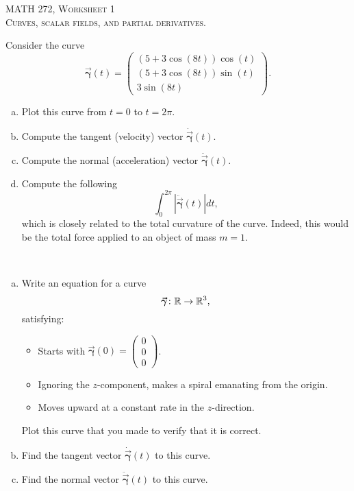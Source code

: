 \documentclass[12pt]{article} %
\newcommand{\curvegamma}{\boldsymbol{\vec{\gamma}}}
\newcommand{\tangentgamma}{\boldsymbol{\dot{\vec{\gamma}}}}
\newcommand{\normalgamma}{\boldsymbol{\ddot{\vec{\gamma}}}}
\begin{document}
\begin{center}
   \textsc{\large MATH 272, Worksheet 1}\\
   \textsc{Curves, scalar fields, and partial derivatives.}
\end{center}
\vspace{.5cm}

\begin{problem}
    Consider the curve 
    \[
    \curvegamma(t) = \begin{pmatrix} (5+3\cos(8t))\cos(t) \\ (5+3\cos(8t))\sin(t) \\ 3\sin(8t) \end{pmatrix}.
    \]
    \begin{enumerate}[(a)]
        \item Plot this curve from $t=0$ to $t=2\pi$.
        \item Compute the tangent (velocity) vector $\tangentgamma(t)$.
        \item Compute the normal (acceleration) vector $\normalgamma(t)$.
        \item Compute the following 
        \[
        \int_0^{2\pi} \left| \normalgamma(t) \right| dt,
        \]
        which is closely related to the total curvature of the curve.  Indeed, this would be the total force applied to an object of mass $m=1$.
    \end{enumerate}
\end{problem}

\begin{problem}~
\begin{enumerate}[(a)]
\item Write an equation for a curve
\[
\curvegamma \colon \R \to \R^3,
\]
satisfying:
\begin{itemize}
    \item Starts with $\curvegamma(0)=\begin{pmatrix} 0 \\ 0 \\ 0 \end{pmatrix}$.
    \item Ignoring the $z$-component, makes a spiral emanating from the origin.
    \item Moves upward at a constant rate in the $z$-direction.
\end{itemize}
Plot this curve that you made to verify that it is correct.
\item Find the tangent vector $\tangentgamma(t)$ to this curve.
\item Find the normal vector $\normalgamma(t)$ to this curve.
\end{enumerate}
\end{problem}
\end{document}
